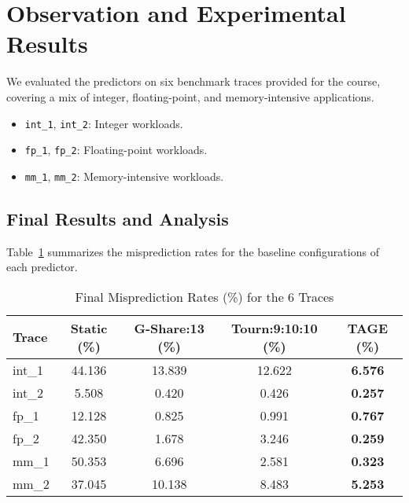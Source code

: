 \documentclass[sigconf, screen]{acmart}
\begin{document}
\section{Observation and Experimental Results}

We evaluated the predictors on six benchmark traces provided for the course, covering a mix of integer, floating-point, and memory-intensive applications.

\begin{itemize}
    \item \texttt{int\_1}, \texttt{int\_2}: Integer workloads.
    \item \texttt{fp\_1}, \texttt{fp\_2}: Floating-point workloads.
    \item \texttt{mm\_1}, \texttt{mm\_2}: Memory-intensive workloads.
\end{itemize}

\subsection{Final Results and Analysis}

Table~\ref{tab:final_results} summarizes the misprediction rates for the baseline configurations of each predictor.

\begin{table}[H]
\captionsetup{font=bf,size=small}
\caption{Final Misprediction Rates (\%) for the 6 Traces}
\label{tab:final_results}
\begin{tabular}{@{}lcccc@{}}
\toprule
\textbf{Trace} & \textbf{Static (\%)} & \textbf{G-Share:13 (\%)} & \textbf{Tourn:9:10:10 (\%)} & \textbf{TAGE (\%)} \\
\midrule
int\_1 & 44.136 & 13.839 & 12.622 & \textbf{6.576} \\
int\_2 & 5.508  & 0.420  & 0.426  & \textbf{0.257} \\
fp\_1  & 12.128 & 0.825  & 0.991  & \textbf{0.767} \\
fp\_2  & 42.350 & 1.678  & 3.246  & \textbf{0.259} \\
mm\_1  & 50.353 & 6.696  & 2.581  & \textbf{0.323} \\
mm\_2  & 37.045 & 10.138 & 8.483  & \textbf{5.253} \\
\bottomrule
\end{tabular}
\end{table}
\end{document}
